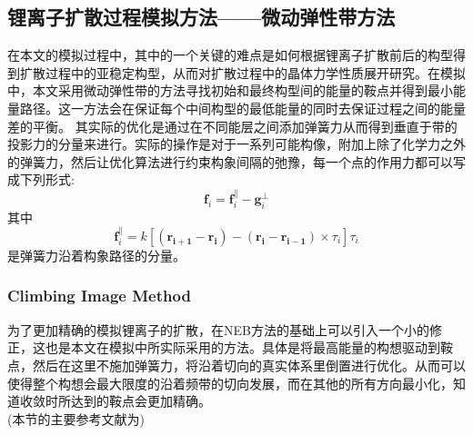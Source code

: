 \subsection{锂离子扩散过程模拟方法——微动弹性带方法}
在本文的模拟过程中，其中的一个关键的难点是如何根据锂离子扩散前后的构型得到扩散过程中的亚稳定构型，从而对扩散过程中的晶体力学性质展开研究。在模拟中，本文采用微动弹性带的方法寻找初始和最终构型间的能量的鞍点并得到最小能量路径。这一方法会在保证每个中间构型的最低能量的同时去保证过程之间的能量差的平衡。 其实际的优化是通过在不同能层之间添加弹簧力从而得到垂直于带的投影力的分量来进行。实际的操作是对于一系列可能构像，附加上除了化学力之外的弹簧力，然后让优化算法进行约束构象间隔的弛豫，每一个点的作用力都可以写成下列形式:
\begin{equation}
\mathbf{f}_i = \mathbf{f}^{\parallel}_i - \mathbf{g}^{\perp}_i
\end{equation}
其中
\begin{equation}
\mathbf{f}^{\parallel}_i = k \left[(\mathbf{r_{i+1}} - \mathbf{r_i}) - (\mathbf{r_i} - \mathbf{r_{i-1}}) \times \tau_i \right]\tau_i
\end{equation}
是弹簧力沿着构象路径的分量。
\subsubsection*{Climbing Image Method}
为了更加精确的模拟锂离子的扩散，在NEB方法的基础上可以引入一个小的修正，这也是本文在模拟中所实际采用的方法。具体是将最高能量的构想驱动到鞍点，然后在这里不施加弹簧力，将沿着切向的真实体系里倒置进行优化。从而可以使得整个构想会最大限度的沿着频带的切向发展，而在其他的所有方向最小化，知道收敛时所达到的鞍点会更加精确。\\
(本节的主要参考文献为\cite{Henkelman2000Improved,Henkelman2000A,Smidstrup2014Improved})
